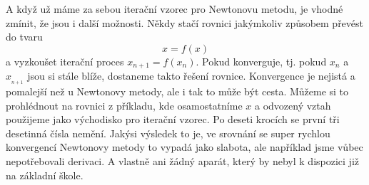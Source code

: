 \documentclass[12pt]{article}
\begin{document}
A když už máme za sebou iterační vzorec pro Newtonovu metodu, je vhodné zmínit, že jsou i další možnosti. Někdy stačí rovnici jakýmkoliv způsobem převést do tvaru $$x=f(x)$$ a vyzkoušet iterační proces $x_{n+1}=f(x_n)$. Pokud konverguje, tj. pokud $x_n$ a $x__{n+1}$ jsou si stále blíže, dostaneme takto řešení rovnice. Konvergence je nejistá a pomalejší než u Newtonovy metody, ale i tak to může být cesta. Můžeme si to prohlédnout na rovnici z příkladu, kde osamostatníme $x$ a odvozený vztah použijeme jako východisko pro iterační vzorec. Po deseti krocích se první tři desetinná čísla nemění. Jakýsi výsledek to je, ve srovnání se super rychlou konvergencí Newtonovy metody to vypadá jako slabota, ale například jsme vůbec nepotřebovali derivaci. A vlastně ani žádný aparát, který by nebyl k dispozici již na základní škole.
\end{document}
